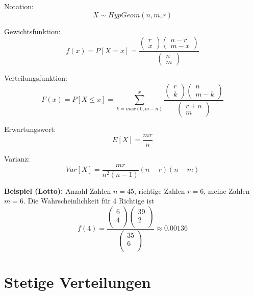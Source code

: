 \documentclass[10pt,a4paper,twocolumn]{article}
\begin{document}
\vspace{10pt}

Notation:
\[
X \sim HypGeom(n,m,r)
\]

Gewichtsfunktion:
\[
f(x)=P[X=x]=\frac{
\left(
	\begin{array}{c}
		r \\ x
	\end{array}
\right)
\left(
	\begin{array}{c}
		n-r \\ m-x
	\end{array}
\right)
}{
\left(
	\begin{array}{c}
		n \\ m
	\end{array}
\right)
}
\]

Verteilungsfunktion:
\[
F(x)=P[X \leq x]=
\sum \limits_{k=max(0,m-n)}^x \frac{
\left(
	\begin{array}{c}
		r \\ k
	\end{array}
\right)
\left(
	\begin{array}{c}
		n \\ m-k
	\end{array}
\right)
}{
\left(
	\begin{array}{c}
		r+n \\ m
	\end{array}
\right)
}
\]

Erwartungswert:
\[
E[X]=\frac{mr}{n}
\]

Varianz:
\[
Var[X]=\frac{mr}{n^2(n-1)}(n-r)(n-m)
\]

\textbf{Beispiel (Lotto):} Anzahl Zahlen $n=45$, richtige Zahlen $r=6$, meine Zahlen $m=6$. Die Wahrscheinlichkeit für $4$ Richtige ist
\[
f(4)=\frac{
	\left(
	\begin{array}{c}
		6 \\
		4 \\
	\end{array}
	\right)
	\left(
	\begin{array}{c}
		39 \\
		2 \\
	\end{array}
	\right)
}{
	\left(
	\begin{array}{c}
		35 \\
		6 \\
	\end{array}
	\right)
}\approx 0.00136
\]

\section{Stetige Verteilungen}
\end{document}
